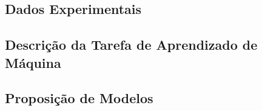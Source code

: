 \subsection{Dados Experimentais}


\subsection{Descrição da Tarefa de Aprendizado de Máquina}


\subsection{Proposição de Modelos}

